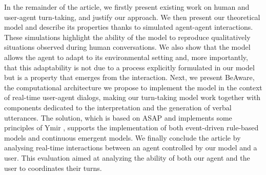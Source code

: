 
In the remainder of the article, we firstly present existing work on human and user-agent turn-taking, and justify our approach. 
We then present our theoretical model and describe its properties thanks to simulated agent-agent interactions. These simulations highlight the ability of the model to reproduce qualitatively situations observed during human conversations. 
We also show that the model allows the agent to adapt to its environmental setting and, more importantly, that this adaptability is not due to a process explicitly formulated in our model but is a property that emerges from the interaction. 
Next, we present BeAware, the computational architecture we propose to implement the model in the context of real-time user-agent dialogs, making our turn-taking model work together with components dedicated to the interpretation and the generation of verbal utterances. The solution, which is based on ASAP \cite{kopp_architecture_2014} and implements some principles of Ymir \cite{thorisson_mind_1999}, supports the implementation of both event-driven rule-based models and continuous emergent models. 
We finally conclude the article by analysing real-time interactions between an agent controlled by our model and a user. 
 This evaluation aimed at analyzing the ability of both our agent and the user to coordinates their turns. 
